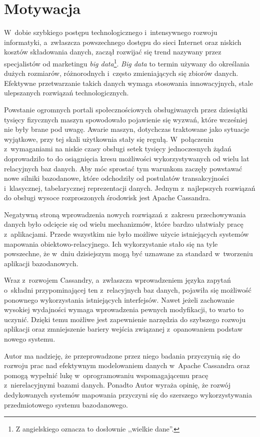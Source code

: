 \section{Motywacja}

W~dobie szybkiego postępu technologicznego i~intensywnego rozwoju informatyki, a~zwłaszcza powszechnego dostępu do sieci Internet oraz niskich kosztów składowania danych, zaczął rozwijać się trend nazywany przez specjalistów od marketingu \emph{big data}\footnote{Z angielskiego oznacza to dosłownie ,,wielkie dane''.}. \emph{Big data} to termin używany do określania dużych rozmiarów, różnorodnych i~często zmieniających się zbiorów danych.~\cite{big_data_definition} Efektywne przetwarzanie takich danych wymaga stosowania innowacyjnych, stale ulepszanych rozwiązań technologicznych. 

Powstanie ogromnych portali społecznościowych obsługiwanych przez dziesiątki tysięcy fizycznych maszyn spowodowało pojawienie się wyzwań, które wcześniej nie były brane pod uwagę. Awarie maszyn, dotychczas traktowane jako sytuacje wyjątkowe, przy tej skali użytkownia stały się regułą. W~połączeniu z~wymaganiami na niskie czasy obsługi setek tysięcy jednoczesnych żądań doprowadziło to do osiągnięcia kresu możliwości wykorzystywanych od wielu lat relacyjnych baz danych. Aby móc sprostać tym warunkom zaczęły powstawać nowe silniki bazodanowe, które odchodziły od postulatów transakcyjności i~klasycznej, tabelarycznej reprezentacji danych. Jednym z~najlepszych rozwiązań do obsługi wysoce rozproszonych środowisk jest Apache Cassandra.

Negatywną stroną wprowadzenia nowych rozwiązań z~zakresu przechowywania danych było odcięcie się od wielu mechanizmów, które bardzo ułatwiały pracę z~aplikacjami. Przede wszystkim nie było możliwe użycie istniejących systemów mapowania obiektowo-relacyjnego. Ich wykorzystanie stało się na tyle powszechne, że w~dniu dzisiejszym mogą być uznawane za standard w~tworzeniu aplikacji bazodanowych.

Wraz z~rozwojem Cassandry, a~zwłaszcza wprowadzeniem języka zapytań o~składni przypominającej ten z~relacyjnych baz danych, pojawiła się możliwość ponownego wykorzystania istniejących interfejsów. Nawet jeżeli zachowanie wysokiej wydajności wymaga wprowadzenia pewnych modyfikacji, to warto to uczynić. Dzięki temu możliwe jest zapewnienie narzędzia do szybszego rozwoju aplikacji oraz zmniejszenie bariery wejścia związanej z~opanowaniem podstaw nowego systemu.

Autor ma nadzieję, że przeprowadzone przez niego badania przyczynią się do rozwoju prac nad efektywnym modelowaniem danych w~Apache Cassandra oraz pomogą wypełnić lukę w~oprogramowaniu wspomagającemu pracę z~nierelacyjnymi bazami danych. Ponadto Autor wyraża opinię, że rozwój dedykowanych systemów mapowania przyczyni się do szerszego wykorzystywania przedmiotowego systemu bazodanowego.

